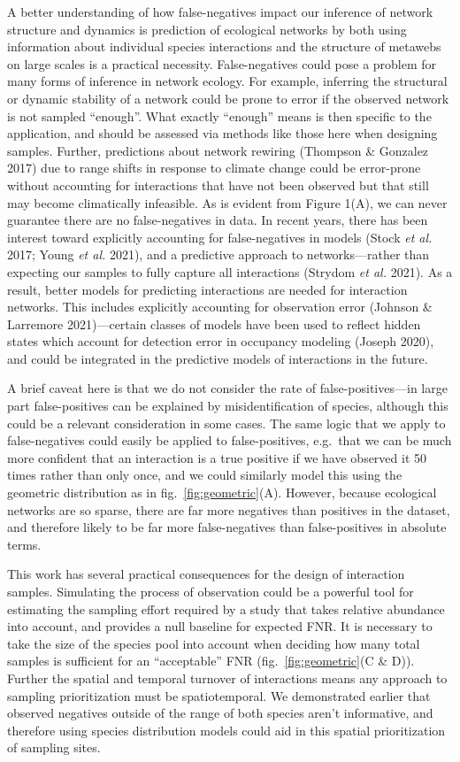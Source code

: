 \documentclass[10pt,oneside]{article}
\begin{document}
A better understanding of how false-negatives impact our inference of
network structure and dynamics is prediction of ecological networks by
both using information about individual species interactions and the
structure of metawebs on large scales is a practical necessity.
False-negatives could pose a problem for many forms of inference in
network ecology. For example, inferring the structural or dynamic
stability of a network could be prone to error if the observed network
is not sampled ``enough''. What exactly ``enough'' means is then
specific to the application, and should be assessed via methods like
those here when designing samples. Further, predictions about network
rewiring (Thompson \& Gonzalez 2017) due to range shifts in response to
climate change could be error-prone without accounting for interactions
that have not been observed but that still may become climatically
infeasible. As is evident from Figure 1(A), we can never guarantee there
are no false-negatives in data. In recent years, there has been interest
toward explicitly accounting for false-negatives in models (Stock
\emph{et al.} 2017; Young \emph{et al.} 2021), and a predictive approach
to networks---rather than expecting our samples to fully capture all
interactions (Strydom \emph{et al.} 2021). As a result, better models
for predicting interactions are needed for interaction networks. This
includes explicitly accounting for observation error (Johnson \&
Larremore 2021)---certain classes of models have been used to reflect
hidden states which account for detection error in occupancy modeling
(Joseph 2020), and could be integrated in the predictive models of
interactions in the future.

A brief caveat here is that we do not consider the rate of
false-positives---in large part false-positives can be explained by
misidentification of species, although this could be a relevant
consideration in some cases. The same logic that we apply to
false-negatives could easily be applied to false-positives, e.g.~that we
can be much more confident that an interaction is a true positive if we
have observed it 50 times rather than only once, and we could similarly
model this using the geometric distribution as in
fig.~\ref{fig:geometric}(A). However, because ecological networks are so
sparse, there are far more negatives than positives in the dataset, and
therefore likely to be far more false-negatives than false-positives in
absolute terms.

This work has several practical consequences for the design of
interaction samples. Simulating the process of observation could be a
powerful tool for estimating the sampling effort required by a study
that takes relative abundance into account, and provides a null baseline
for expected FNR. It is necessary to take the size of the species pool
into account when deciding how many total samples is sufficient for an
``acceptable'' FNR (fig.~\ref{fig:geometric}(C \& D)). Further the
spatial and temporal turnover of interactions means any approach to
sampling prioritization must be spatiotemporal. We demonstrated earlier
that observed negatives outside of the range of both species aren't
informative, and therefore using species distribution models could aid
in this spatial prioritization of sampling sites.
\end{document}
